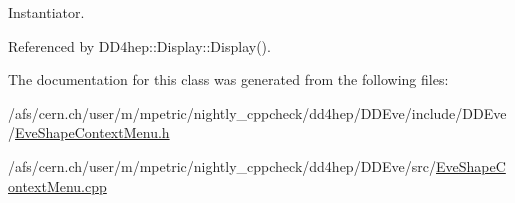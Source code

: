 Instantiator. 

Referenced by DD4hep::Display::Display().

The documentation for this class was generated from the following files:\begin{DoxyCompactItemize}
\item 
/afs/cern.ch/user/m/mpetric/nightly\_\-cppcheck/dd4hep/DDEve/include/DDEve/\hyperlink{_eve_shape_context_menu_8h}{EveShapeContextMenu.h}\item 
/afs/cern.ch/user/m/mpetric/nightly\_\-cppcheck/dd4hep/DDEve/src/\hyperlink{_eve_shape_context_menu_8cpp}{EveShapeContextMenu.cpp}\end{DoxyCompactItemize}
